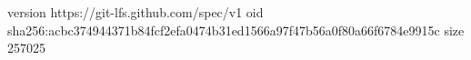 version https://git-lfs.github.com/spec/v1
oid sha256:acbc374944371b84fcf2efa0474b31ed1566a97f47b56a0f80a66f6784e9915c
size 257025
